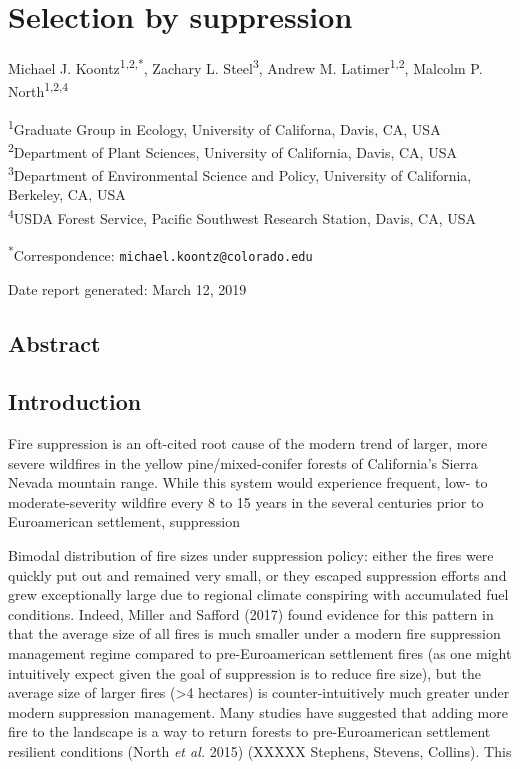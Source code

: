 \documentclass[]{article}
\title{}
\author{}
\date{}
\begin{document}
\section{Selection by suppression}\label{selection-by-suppression}

Michael J. Koontz\textsuperscript{1,2,*}, Zachary L.
Steel\textsuperscript{3}, Andrew M. Latimer\textsuperscript{1,2},
Malcolm P. North\textsuperscript{1,2,4}

\textsuperscript{1}Graduate Group in Ecology, University of Californa,
Davis, CA, USA\\
\textsuperscript{2}Department of Plant Sciences, University of
California, Davis, CA, USA\\
\textsuperscript{3}Department of Environmental Science and Policy,
University of California, Berkeley, CA, USA\\
\textsuperscript{4}USDA Forest Service, Pacific Southwest Research
Station, Davis, CA, USA

\textsuperscript{*}Correspondence: \texttt{michael.koontz@colorado.edu}

Date report generated: March 12, 2019

\subsection{Abstract}\label{abstract}

\subsection{Introduction}\label{introduction}

Fire suppression is an oft-cited root cause of the modern trend of
larger, more severe wildfires in the yellow pine/mixed-conifer forests
of California's Sierra Nevada mountain range. While this system would
experience frequent, low- to moderate-severity wildfire every 8 to 15
years in the several centuries prior to Euroamerican settlement,
suppression

Bimodal distribution of fire sizes under suppression policy: either the
fires were quickly put out and remained very small, or they escaped
suppression efforts and grew exceptionally large due to regional climate
conspiring with accumulated fuel conditions. Indeed, Miller and Safford
(2017) found evidence for this pattern in that the average size of all
fires is much smaller under a modern fire suppression management regime
compared to pre-Euroamerican settlement fires (as one might intuitively
expect given the goal of suppression is to reduce fire size), but the
average size of larger fires (\textgreater{}4 hectares) is
counter-intuitively much greater under modern suppression management.
Many studies have suggested that adding more fire to the landscape is a
way to return forests to pre-Euroamerican settlement resilient
conditions (North \emph{et al.} 2015) (XXXXX Stephens, Stevens,
Collins). This
\end{document}
